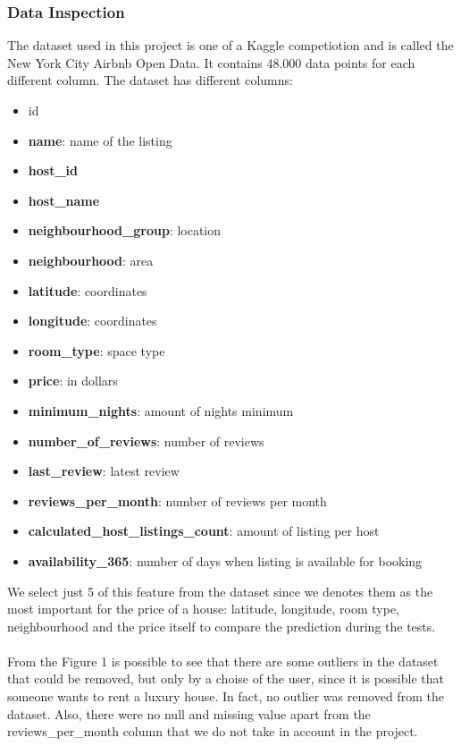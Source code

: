 \documentclass{FR16}
\begin{document}
\subsubsection{Data Inspection}
The dataset used in this project is one of a Kaggle competiotion and is called the New York City Airbnb Open Data. It contains 48.000 data points for each different column.
The dataset has different columns: 
\begin{itemize}
\itemsep0em 
\item id
\item \textbf{name}: name of the listing
\item \textbf{host\_id}
\item \textbf{host\_name}
\item \textbf{neighbourhood\_group}: location
\item \textbf{neighbourhood}: area
\item \textbf{latitude}: coordinates
\item \textbf{longitude}: coordinates
\item \textbf{room\_type}: space type
\item \textbf{price}:  in dollars
\item \textbf{minimum\_nights}: amount of nights minimum
\item \textbf{number\_of\_reviews}: number of reviews
\item \textbf{last\_review}: latest review
\item \textbf{reviews\_per\_month}: number of reviews per month
\item \textbf{calculated\_host\_listings\_count}: amount of listing per host
\item  \textbf{availability\_365}: number of days when listing is available for booking\\
\end{itemize}
We select just 5 of this feature from the dataset since we denotes them as the most important for the price of a house: latitude, longitude, room type, neighbourhood and the price itself to compare the prediction during the tests. \\\\
From the Figure 1 is possible to see that there are some outliers in the dataset that could be removed, but only by a choise of the user, since it is possible that someone wants to rent a luxury house. In fact, no outlier was removed from the dataset. Also, there were no null and missing value apart from the reviews\_per\_month column that we do not take in account in the project.
\end{document}
